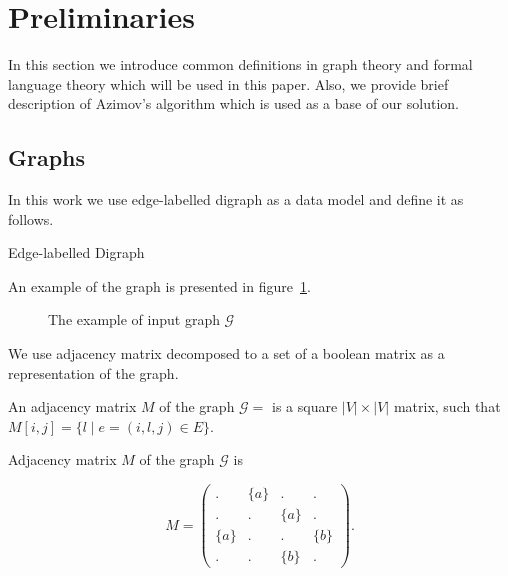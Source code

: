 \section{Preliminaries}

In this section we introduce common definitions in graph theory and formal language theory which will be used in this paper. 
Also, we provide brief description of Azimov's algorithm which is used as a base of our solution.

\subsection{Graphs}

In this work we use edge-labelled digraph as a data model and define it as follows.
\begin{definition}
Edge-labelled Digraph
\end{definition}

An example of the graph is presented in figure~\ref{fig:example_input_graph}.

\begin{figure}[h]
    \centering        
    \caption{The example of input graph $\mathcal{G}$}
    \label{fig:example_input_graph}
\end{figure}

We use adjacency matrix decomposed to a set of a boolean matrix as a representation of the graph.
\begin{definition}
An adjacency matrix $M$ of the graph $\mathcal{G}=$ is a square $|V|\times|V|$ matrix, such that $M[i,j] = \{l \mid e = (i,l,j) \in E\}$.
\end{definition}

Adjacency matrix $M$ of the graph $\mathcal{G}$ is

$$
    M =
    \begin{pmatrix}
    . & \{a\} & . & .     \\
    . & . & \{a\} & .     \\
    \{a\} & . & . & \{b\} \\
    . & . & \{b\} & .
    \end{pmatrix}.
$$

